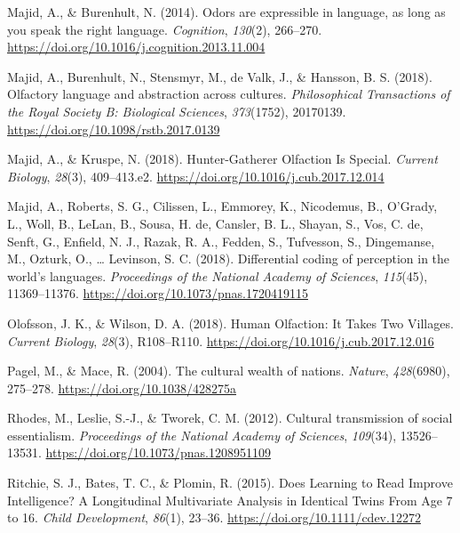 \documentclass[11pt,man]{article}
\newlength{\cslhangindent}
\newenvironment{cslreferences}%
  {\setlength{\parindent}{0pt}%
  \everypar{\setlength{\hangindent}{\cslhangindent}}\ignorespaces}%
  {\par}
\begin{document}
\begin{cslreferences}
\leavevmode\hypertarget{ref-majid_odors_2014}{}%
Majid, A., \& Burenhult, N. (2014). Odors are expressible in language,
as long as you speak the right language. \emph{Cognition},
\emph{130}(2), 266--270.
\url{https://doi.org/10.1016/j.cognition.2013.11.004}

\leavevmode\hypertarget{ref-majid_olfactory_2018}{}%
Majid, A., Burenhult, N., Stensmyr, M., de Valk, J., \& Hansson, B. S.
(2018). Olfactory language and abstraction across cultures.
\emph{Philosophical Transactions of the Royal Society B: Biological
Sciences}, \emph{373}(1752), 20170139.
\url{https://doi.org/10.1098/rstb.2017.0139}

\leavevmode\hypertarget{ref-majid_hunter-gatherer_2018}{}%
Majid, A., \& Kruspe, N. (2018). Hunter-Gatherer Olfaction Is Special.
\emph{Current Biology}, \emph{28}(3), 409--413.e2.
\url{https://doi.org/10.1016/j.cub.2017.12.014}

\leavevmode\hypertarget{ref-majid_differential_2018}{}%
Majid, A., Roberts, S. G., Cilissen, L., Emmorey, K., Nicodemus, B.,
O'Grady, L., Woll, B., LeLan, B., Sousa, H. de, Cansler, B. L., Shayan,
S., Vos, C. de, Senft, G., Enfield, N. J., Razak, R. A., Fedden, S.,
Tufvesson, S., Dingemanse, M., Ozturk, O., \ldots{} Levinson, S. C.
(2018). Differential coding of perception in the world's languages.
\emph{Proceedings of the National Academy of Sciences}, \emph{115}(45),
11369--11376. \url{https://doi.org/10.1073/pnas.1720419115}

\leavevmode\hypertarget{ref-olofsson_human_2018}{}%
Olofsson, J. K., \& Wilson, D. A. (2018). Human Olfaction: It Takes Two
Villages. \emph{Current Biology}, \emph{28}(3), R108--R110.
\url{https://doi.org/10.1016/j.cub.2017.12.016}

\leavevmode\hypertarget{ref-pagel_cultural_2004}{}%
Pagel, M., \& Mace, R. (2004). The cultural wealth of nations.
\emph{Nature}, \emph{428}(6980), 275--278.
\url{https://doi.org/10.1038/428275a}

\leavevmode\hypertarget{ref-rhodes_cultural_2012}{}%
Rhodes, M., Leslie, S.-J., \& Tworek, C. M. (2012). Cultural
transmission of social essentialism. \emph{Proceedings of the National
Academy of Sciences}, \emph{109}(34), 13526--13531.
\url{https://doi.org/10.1073/pnas.1208951109}

\leavevmode\hypertarget{ref-ritchie_does_2015}{}%
Ritchie, S. J., Bates, T. C., \& Plomin, R. (2015). Does Learning to
Read Improve Intelligence? A Longitudinal Multivariate Analysis in
Identical Twins From Age 7 to 16. \emph{Child Development},
\emph{86}(1), 23--36. \url{https://doi.org/10.1111/cdev.12272}


\end{cslreferences}
\end{document}
